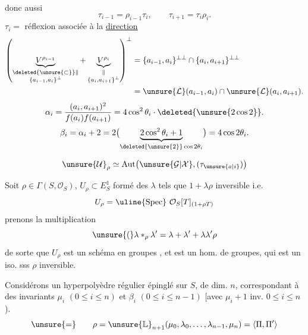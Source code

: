 donc aussi
\[
\tau_{i-1}=\rho_{i-1}\tau_i,\qquad
\tau_{i+1}=\tau_i\rho_i.
\]
$\tau_i=$  réflexion associée à la \uline{direction}
\[
\begin{aligned}
\left(
\underbrace{V^{\rho_{i-1}}}_{\substack{\deleted{\unsure{\subset}}\Vert\\\{a_{i-1},a_i\}^{\perp}}}
+
\underbrace{V^{\rho_i}}_{\substack{\Vert\\\{a_i,a_{i+1}\}^{\perp}}}
\right)^\perp
&=\{a_{i-1},a_i\}^{\perp\perp}\cap\{a_i,a_{i+1}\}^{\perp\perp}\\
&=\unsure{\mathcal L}(a_{i-1},a_i)\cap\unsure{\mathcal L}(a_i,a_{i+1}).
\end{aligned}
\]
\[
\alpha_i=\frac{(a_i,a_{i+1})^2}{f(a_i)f(a_{i+1})}
=4\cos^2\theta_i\cdot\deleted{\unsure{2\cos2}}.
\]
\[
\beta_i=\alpha_i+2
=2\bigl(\underbrace{2\cos^2\theta_i+1}_{\deleted{\unsure{2}}\cos2\theta_i}\bigr)
=4\cos2\theta_i.
\]

\[
\unsure{\mathcal U}_{\rho}\simeq
\operatorname{Aut}\bigl(\unsure{\mathcal G|\mathcal X},(\tau_{\unsure{a|i}})\bigr)
\]

Soit $\rho\in\Gamma(S,\mathcal O_S)$, $U_\rho\subset E^1_S$ formé des $\lambda$ tels que
$1+\lambda\rho$ inversible i.e.
\[
U_\rho=\uline{\operatorname{Spec}}\ \mathcal O_S[T]_{(1+\rho T)}
\]
prenons la multiplication
\[
\unsure{(}\lambda *_\rho\lambda'=\lambda+\lambda'+\lambda\lambda'\rho
\]
de sorte que $U_\rho$ est un schéma en groupes
, et
est un hom. de groupes, qui est un iso. sss $\rho$ inversible.

Considérons un hyperpolyèdre régulier  épinglé sur $S$, de dim. $n$,
correspondant à des invariants $\mu_i$ $(0\le i\le n)$ et $\beta_i$
$(0\le i\le n-1)$ [avec $\mu_i+1$ inv. $0\le i\le n$).
\[
\unsure{=}\qquad
\rho=\unsure{\mathbb L}_{n+1}(\mu_0,\lambda_0,\ldots,\lambda_{n-1},\mu_n)
=\langle\Pi,\Pi'\rangle
\]


